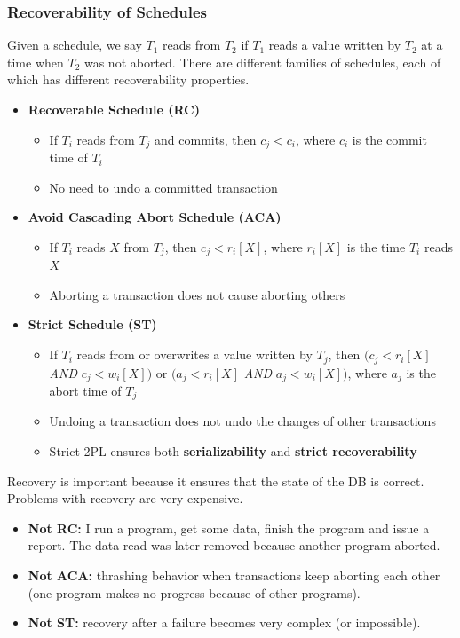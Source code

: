 \subsubsection{Recoverability of Schedules}
Given a schedule, we say $T_1$ reads from $T_2$ if $T_1$ reads a value written by $T_2$ at a time when $T_2$ was not aborted. There are different families of schedules, each of which has different recoverability properties.
\begin{itemize}
\item \textbf{Recoverable Schedule (RC)}
\begin{itemize}
\item If $T_i$ reads from $T_j$ and commits, then $c_j < c_i$, where $c_i$ is the commit time of $T_i$ 
\item No need to undo a committed transaction
\end{itemize}
\item \textbf{Avoid Cascading Abort Schedule (ACA)}
\begin{itemize}
\item If $T_i$ reads $X$ from $T_j$, then $c_j < r_i[X]$, where $r_i[X]$ is the time $T_i$ reads $X$
\item Aborting a transaction does not cause aborting others
\end{itemize}
\item \textbf{Strict Schedule (ST)}
\begin{itemize}
\item If $T_i$ reads from or overwrites a value written by $T_j$, then $(c_j < r_i[X]$ \textit{AND} $c_j < w_i[X])$ or $(a_j < r_i[X]$ \textit{AND} $a_j < w_i[X])$, where $a_j$ is the abort time of $T_j$
\item Undoing a transaction does not undo the changes of other transactions
\item Strict 2PL ensures both \textbf{serializability} and \textbf{strict recoverability}
\end{itemize}
\end{itemize}
Recovery is important because it ensures that the state of the DB is correct. Problems with recovery are very expensive.
\begin{itemize}
\item \textbf{Not RC:} I run a program, get some data, finish the program and issue a report. The data read was later removed because another program aborted.
\item \textbf{Not ACA:} thrashing behavior when transactions keep aborting each other (one program makes no progress because of other programs).
\item \textbf{Not ST:} recovery after a failure becomes very complex (or impossible).
\end{itemize}
